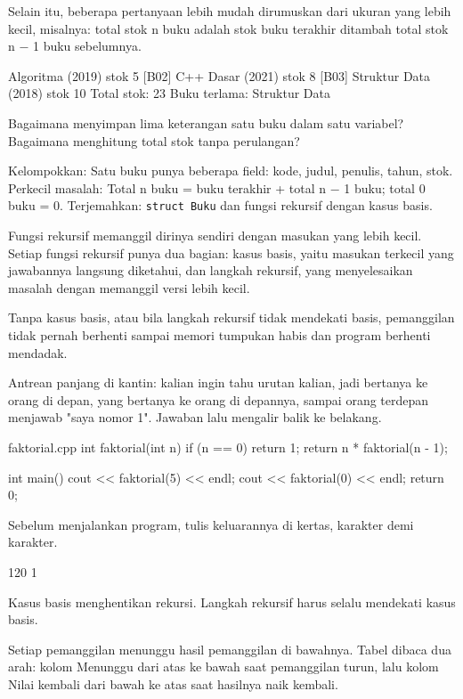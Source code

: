 \documentclass[a4paper]{article}
\begin{document}
Selain itu, beberapa pertanyaan lebih mudah dirumuskan dari ukuran yang lebih kecil, misalnya: total stok n buku adalah stok buku terakhir ditambah total stok n − 1 buku sebelumnya.

\begin{MKeluaran}[title={Tampilan yang diinginkan}]
[B01] Algoritma (2019) stok 5
[B02] C++ Dasar (2021) stok 8
[B03] Struktur Data (2018) stok 10
Total stok: 23
Buku terlama: Struktur Data
\end{MKeluaran}
\begin{Tebak}
Bagaimana menyimpan lima keterangan satu buku dalam satu variabel? Bagaimana menghitung total stok tanpa perulangan?
\end{Tebak}
\begin{Jawaban}
Kelompokkan: Satu buku punya beberapa field: kode, judul, penulis, tahun, stok. Perkecil masalah: Total n buku = buku terakhir + total n − 1 buku; total 0 buku = 0. Terjemahkan: \texttt{struct Buku} dan fungsi rekursif dengan kasus basis.
\end{Jawaban}
Fungsi rekursif memanggil dirinya sendiri dengan masukan yang lebih kecil. Setiap fungsi rekursif punya dua bagian: kasus basis, yaitu masukan terkecil yang jawabannya langsung diketahui, dan langkah rekursif, yang menyelesaikan masalah dengan memanggil versi lebih kecil.

Tanpa kasus basis, atau bila langkah rekursif tidak mendekati basis, pemanggilan tidak pernah berhenti sampai memori tumpukan habis dan program berhenti mendadak.

\begin{Contoh}
Antrean panjang di kantin: kalian ingin tahu urutan kalian, jadi bertanya ke orang di depan, yang bertanya ke orang di depannya, sampai orang terdepan menjawab "saya nomor 1". Jawaban lalu mengalir balik ke belakang.
\end{Contoh}
\begin{MKode}{faktorial.cpp}
int faktorial(int n) {
    if (n == 0) return 1;
    return n * faktorial(n - 1);
}

int main() {
    cout << faktorial(5) << endl;
    cout << faktorial(0) << endl;
    return 0;
}
\end{MKode}
\begin{Tebak}[]
Sebelum menjalankan program, tulis keluarannya di kertas, karakter demi karakter.
\end{Tebak}
\begin{Jawaban}[]
\begin{MKeluaran}[]
120
1
\end{MKeluaran}
Kasus basis menghentikan rekursi. Langkah rekursif harus selalu mendekati kasus basis.
\end{Jawaban}
Setiap pemanggilan menunggu hasil pemanggilan di bawahnya. Tabel dibaca dua arah: kolom Menunggu dari atas ke bawah saat pemanggilan turun, lalu kolom Nilai kembali dari bawah ke atas saat hasilnya naik kembali.
\end{document}
